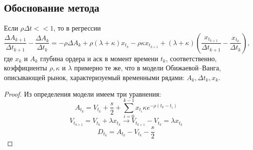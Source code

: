 \begin{appendices} %



	\section{Обоснование метода}
        
        \begin{theorem}
                Если $\rho \Delta t << 1$, то в регрессии                                                                                                                                                                                                                                                                                                                                                                                       
                \begin{equation*}
                        \frac{\Delta A_{k+1}}{\Delta t_{k+1}} - \frac{\Delta A_{k}}{\Delta t_{k}}
                        = -\rho \Delta A_k + \rho (\lambda + \kappa) x_{t_k} - \rho \kappa x_{t_{k+1}} + 
                        (\lambda + \kappa) \left(\frac{x_{t_{k+1}}}{\Delta t_{k+1}} - \frac{x_{t_k}}{\Delta t_{k}}\right),
                \end{equation*}
                где $x_{k}$ и $A_{k}$ глубина ордера и аск в момент времени $t_k$, соответственно, \\

                коэффициенты $\rho, \kappa$ и $\lambda$ примерно те же, что в модели Обижаевой--Ванга, описывающей рынок,
                характеризуемый временными рядами: $A_k, \Delta t _k, x_k$.


\end{theorem}
\begin{proof}
        Из определения модели имеем три уравнения:
        \begin{equation} \label{rp1}
                A_{t_k} = V_{t_k} + \frac{s}{2} + \sum _{i=0} ^{k-1} x_{t_i} \kappa e^{- \rho (t_k - t_i)}
        \end{equation}
        \begin{equation}\label{rp2}
                V_{t_{k+1}} = V_{t_k} + \lambda x_{t_k} \rightarrow V_{t_{k+1}} - V_{t_k} = \lambda x_{t_{k}}
        \end{equation}
        \begin{equation} \label{rp3}
                D_{t_k} = A_{t_k} - V_{t_k} - \frac{s}{2}
        \end{equation}


\end{proof}
\end{appendices}
